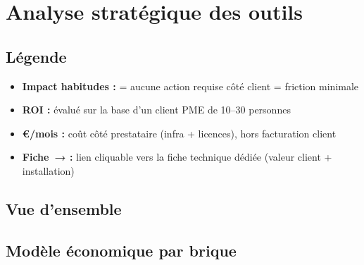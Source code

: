 \section{Analyse stratégique des outils}

\subsection{Légende}

\begin{itemize}
  \item \textbf{Impact habitudes :}
    \invisible{} = aucune action requise côté client \quad
    \leger{} = friction minimale
  \item \textbf{ROI :} évalué sur la base d'un client PME de 10–30 personnes
  \item \textbf{€/mois :} coût côté prestataire (infra + licences), hors facturation client
  \item \textbf{Fiche~→ :} lien cliquable vers la fiche technique dédiée (valeur client + installation)
\end{itemize}

\subsection{Vue d'ensemble}



\subsection{Modèle économique par brique}


